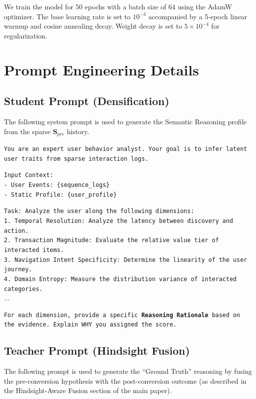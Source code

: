 We train the model for 50 epochs with a batch size of 64 using the AdamW optimizer. The base learning rate is set to $10^{-3}$ accompanied by a 5-epoch linear warmup and cosine annealing decay. Weight decay is set to $5 \times 10^{-4}$ for regularization.

\section{Prompt Engineering Details}
\label{app:prompts}

\subsection{Student Prompt (Densification)}
The following system prompt is used to generate the Semantic Reasoning profile from the sparse $\mathbf{S}_{pre}$ history.

\begin{tcolorbox}[colback=gray!10, colframe=gray!50, title=System Prompt: Student Profile Generation]
\small
\texttt{You are an expert user behavior analyst. Your goal is to infer latent user traits from sparse interaction logs.}

\texttt{Input Context:} \\
\texttt{- User Events: \{sequence\_logs\}} \\
\texttt{- Static Profile: \{user\_profile\}}

\texttt{Task: Analyze the user along the following dimensions:} \\
\texttt{1. Temporal Resolution: Analyze the latency between discovery and action.} \\
\texttt{2. Transaction Magnitude: Evaluate the relative value tier of interacted items.} \\
\texttt{3. Navigation Intent Specificity: Determine the linearity of the user journey.} \\
\texttt{4. Domain Entropy: Measure the distribution variance of interacted categories.}
\\
...

\texttt{For each dimension, provide a specific \textbf{Reasoning Rationale} based on the evidence. Explain WHY you assigned the score.}
\end{tcolorbox}

\subsection{Teacher Prompt (Hindsight Fusion)}
The following prompt is used to generate the ``Ground Truth'' reasoning by fusing the pre-conversion hypothesis with the post-conversion outcome (as described in the Hindsight-Aware Fusion section of the main paper).

